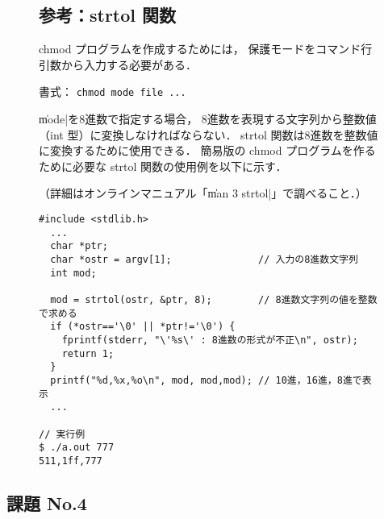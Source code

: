 \begin{figure}
\begin{framed}
\subsection*{参考：strtol 関数}
chmod プログラムを作成するためには，
保護モードをコマンド行引数から入力する必要がある．

\centerline{書式： \texttt{chmod mode file ...}}

\|mode|を8進数で指定する場合，
8進数を表現する文字列から整数値（int 型）に変換しなければならない．
strtol 関数は8進数を整数値に変換するために使用できる．
簡易版の chmod プログラムを作るために必要な
strtol 関数の使用例を以下に示す．

（詳細はオンラインマニュアル「\|man 3 strtol|」で調べること．）

\begin{lstlisting}[numbers=none, frame=none]
#include <stdlib.h>
  ...
  char *ptr;
  char *ostr = argv[1];               // 入力の8進数文字列
  int mod;

  mod = strtol(ostr, &ptr, 8);        // 8進数文字列の値を整数で求める
  if (*ostr=='\0' || *ptr!='\0') {
    fprintf(stderr, "\'%s\' : 8進数の形式が不正\n", ostr);
    return 1;
  }
  printf("%d,%x,%o\n", mod, mod,mod); // 10進，16進，8進で表示
  ...

// 実行例
$ ./a.out 777
511,1ff,777
\end{lstlisting}
\end{framed}
\end{figure}

\subsection*{課題 No.4}

